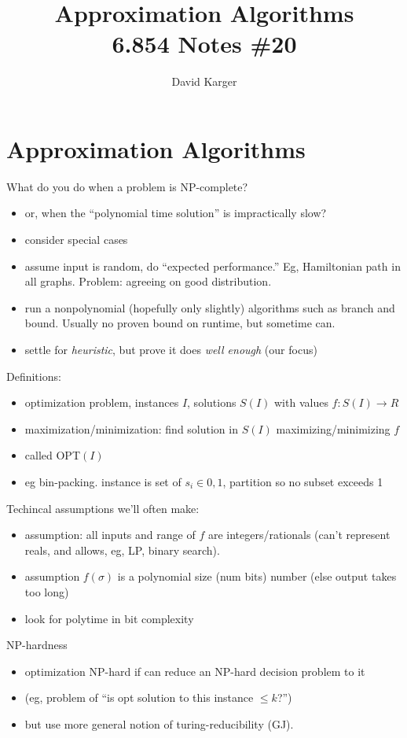 \documentclass{article}
\title{Approximation Algorithms\\ 6.854 Notes \#20}
\author{David Karger}
\begin{document}
\section*{Approximation Algorithms}
What do you do when a problem is NP-complete?
\begin{itemize}
\item or, when the ``polynomial time solution'' is impractically slow?
\item consider special cases
\item assume input is random, do ``expected performance.''  Eg,
  Hamiltonian path in all graphs.  Problem: agreeing on good
  distribution.  
\item run a nonpolynomial (hopefully only slightly) algorithms such as
  branch and bound.  Usually no proven bound on runtime, but sometime can.
\item settle for \emph{heuristic}, but prove it does \emph{well enough}
  (our focus) 
\end{itemize}

Definitions:
\begin{itemize}
\item optimization problem, instances $I$, solutions $S(I)$ with
  values $f:S(I) \rightarrow R$
\item maximization/minimization: find solution in $S(I)$
  maximizing/minimizing $f$ 
\item called OPT$(I)$
\item eg bin-packing.  instance is set of $s_i \in {0,1}$, partition
  so no subset exceeds 1
\end{itemize}

Techincal assumptions we'll often make:
\begin{itemize}
\item assumption: all inputs and range of $f$ are integers/rationals
  (can't represent reals, and allows, eg, LP, binary search).  
\item assumption $f(\sigma)$ is a polynomial size (num bits) number
  (else output takes too long)
\item look for polytime in bit complexity
\end{itemize}

NP-hardness
\begin{itemize}
\item optimization NP-hard if can reduce  an NP-hard decision problem to it
\item (eg, problem of ``is opt solution to this instance $\le k$?'')
\item but use more general notion of turing-reducibility (GJ).
\end{itemize}
\end{document}
